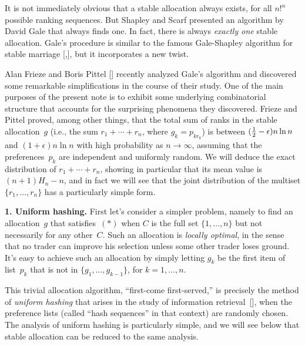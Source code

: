 It is not immediately obvious that a stable allocation always exists, for all
$n!^n$ possible ranking sequences. 
But Shapley and Scarf presented an algorithm by David Gale that always finds
one. In fact, there is always {\it exactly one\/}  stable allocation. Gale's
procedure is similar to the famous Gale-Shapley algorithm for stable marriage
[\gs,\gi], but it incorporates a new twist. 

Alan Frieze and Boris Pittel [\fp] recently analyzed Gale's algorithm and
discovered some remarkable simplifications in the course of their study. One of
the main purposes of the present note is to exhibit some underlying
combinatorial structure that accounts for the surprising phenomena they
discovered. Frieze and Pittel proved, among other things, that the total sum of
ranks in the stable allocation~$g$ (i.e., the sum $r_1+\cdots +r_n$, where
$g_k=p_{kr_k}$) is between $({1\over 2}-\epsilon)n\ln n$ and $(1+\epsilon)n\ln
n$ with high probability as $n\rightarrow\infty$, assuming that the
preferences~$p_k$ are independent and uniformly random.
We will deduce the exact distribution of $r_1+\cdots +r_n$, showing in
particular that its mean value is $(n+1)H_n-n$, and in fact we will see
that the joint distribution of the multiset $\{r_1,\ldots,r_n\}$ has a
particularly simple form.

\meno
{\bf 1. Uniform hashing.}
First let's consider a simpler problem, namely to find an allocation~$g$ that
satisfies~$(\ast)$ when $C$ is the full set $\{1,\ldots,n\}$ but not
necessarily for any other~$C$. Such an allocation is {\it locally optimal}, in
the sense that no trader can improve his selection unless some other trader
loses ground. It's easy to achieve such an allocation by simply letting $g_k$
be the first item of list~$p_k$ that is not in $\{g_1,\ldots,g_{k-1}\}$, for
$k=1,\ldots,n$. 

This trivial allocation algorithm, ``first-come first-served,'' is precisely
the method of {\it uniform hashing\/} that arises in the study of information
retrieval~[\ks], when the preference lists (called ``hash sequences'' in that
context) are randomly chosen. The analysis of uniform hashing is particularly
simple, and we will see below that stable allocation can be reduced to the same
analysis. 


